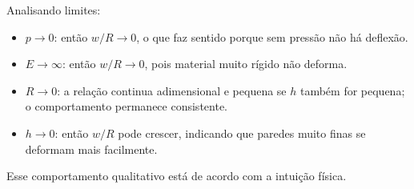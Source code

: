 Analisando limites:
\begin{itemize}
\item $p\to0$: então $w/R\to0$, o que faz sentido porque sem pressão não há deflexão.
\item $E\to\infty$: então $w/R\to0$, pois material muito rígido não deforma.
\item $R\to0$: a relação continua adimensional e pequena se $h$ também for pequena; o comportamento permanece consistente.
\item $h\to0$: então $w/R$ pode crescer, indicando que paredes muito finas se deformam mais facilmente.
\end{itemize}
Esse comportamento qualitativo está de acordo com a intuição física. 